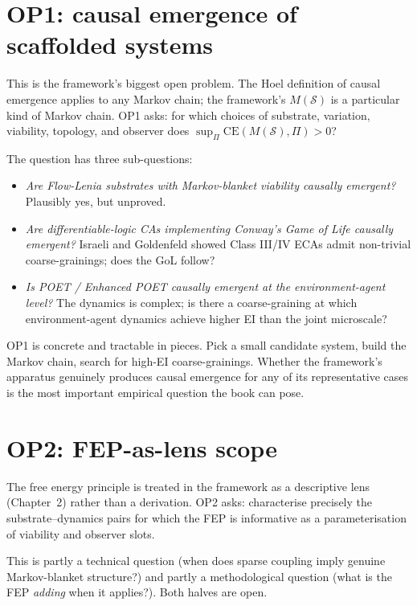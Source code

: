 \section{OP1: causal emergence of scaffolded systems}

This is the framework's biggest open problem. The Hoel definition of
causal emergence applies to any Markov chain; the framework's $M(
\mathcal{S})$ is a particular kind of Markov chain. OP1 asks: for
which choices of substrate, variation, viability, topology, and
observer does $\sup_\Pi \mathrm{CE}(M(\mathcal{S}), \Pi) > 0$?

The question has three sub-questions:

\begin{itemize}[leftmargin=1.5em,itemsep=2pt]
  \item \emph{Are Flow-Lenia substrates with Markov-blanket viability
    causally emergent?} Plausibly yes, but unproved.
  \item \emph{Are differentiable-logic CAs implementing Conway's Game
    of Life causally emergent?} Israeli and Goldenfeld showed Class
    III/IV ECAs admit non-trivial coarse-grainings; does the GoL
    follow?
  \item \emph{Is POET / Enhanced POET causally emergent at the
    environment-agent level?} The dynamics is complex; is there a
    coarse-graining at which environment-agent dynamics achieve
    higher EI than the joint microscale?
\end{itemize}

OP1 is concrete and tractable in pieces. Pick a small candidate
system, build the Markov chain, search for high-EI coarse-grainings.
Whether the framework's apparatus genuinely produces causal emergence
for any of its representative cases is the most important empirical
question the book can pose.

\section{OP2: FEP-as-lens scope}

The free energy principle is treated in the framework as a
descriptive lens (Chapter~2) rather than a derivation. OP2 asks:
characterise precisely the substrate--dynamics pairs for which the
FEP is informative as a parameterisation of viability and observer
slots.

This is partly a technical question (when does sparse coupling
imply genuine Markov-blanket structure?) and partly a methodological
question (what is the FEP \emph{adding} when it applies?). Both halves
are open.

